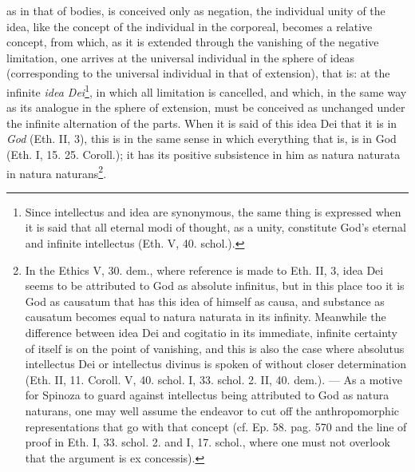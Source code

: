 \documentclass[12pt,a4paper,openany]{book}
\newcommand{\opage}[1]{\marginnote{\footnotesize\textit{[#1]}}}
\begin{document}
as in that of bodies, is conceived only as negation, the
individual unity of the idea, like the concept of the individual in the
corporeal, becomes a relative concept, from which, as it is
\opage{84}\setcounter{footnote}{0}extended through the vanishing of the negative limitation, one arrives at
the universal individual in the sphere of ideas (corresponding to the
universal individual in that of extension), that is: at the
infinite \emph{idea Dei}\footnote{Since intellectus and idea are
synonymous, the same thing is expressed when it is said that all
eternal modi of thought, as a unity, constitute God's eternal and infinite
intellectus (Eth. V, 40. schol.).}, in which all limitation
is cancelled, and which, in the same way as its analogue in
the sphere of extension, must be conceived as unchanged under
the infinite alternation of the parts. When it is said of this idea Dei that
it is in \emph{God} (Eth. II, 3), this is in the same sense in
which everything that is, is in God (Eth. I, 15. 25. Coroll.);
it has its positive subsistence in him as natura naturata in
natura naturans\footnote{In the Ethics V, 30. dem., where
reference is made to Eth. II, 3, idea Dei seems to be attributed to God as
absolute infinitus, but in this place too it is God as
causatum that has this idea of himself as causa, and substance
as causatum becomes equal to natura naturata in its
infinity. Meanwhile the difference between idea Dei and
cogitatio in its immediate, infinite certainty of itself
is on the point of vanishing, and this is also the case where
absolutus intellectus Dei or intellectus divinus is spoken of without
closer determination (Eth. II, 11. Coroll. V, 40. schol.
I, 33. schol. 2. II, 40. dem.). --- As a motive for Spinoza
to guard against intellectus being attributed to God as natura
naturans, one may well assume the endeavor to cut off the
anthropomorphic representations that go with that concept
(cf. Ep. 58. pag. 570 and the line of proof in Eth. I, 33. schol.
2. and I, 17. schol., where one must not overlook that the
argument is ex concessis).}.
\end{document}
